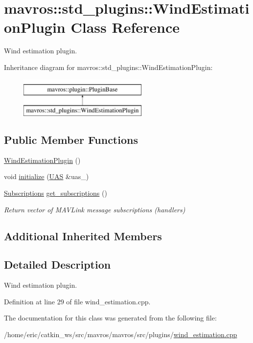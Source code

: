 \hypertarget{classmavros_1_1std__plugins_1_1WindEstimationPlugin}{}\section{mavros\+::std\+\_\+plugins\+::Wind\+Estimation\+Plugin Class Reference}
\label{classmavros_1_1std__plugins_1_1WindEstimationPlugin}


Wind estimation plugin.  


Inheritance diagram for mavros\+::std\+\_\+plugins\+::Wind\+Estimation\+Plugin\+:\begin{figure}[H]
\begin{center}
\leavevmode
\includegraphics[height=2.000000cm]{classmavros_1_1std__plugins_1_1WindEstimationPlugin}
\end{center}
\end{figure}
\subsection*{Public Member Functions}
\begin{DoxyCompactItemize}
\item 
\mbox{\hyperlink{group__plugin_gaf656179c4da289caeea0c7ee36c25de2}{Wind\+Estimation\+Plugin}} ()
\item 
void \mbox{\hyperlink{group__plugin_ga6811f85521065b479c973b2d82353927}{initialize}} (\mbox{\hyperlink{classmavros_1_1UAS}{U\+AS}} \&uas\+\_\+)
\item 
\mbox{\hyperlink{group__plugin_ga8967d61fc77040e0c3ea5a4585d62a09}{Subscriptions}} \mbox{\hyperlink{group__plugin_ga7db9ebfdb92e2537b3b3b844a2483617}{get\+\_\+subscriptions}} ()
\begin{DoxyCompactList}\small\item\em Return vector of M\+A\+V\+Link message subscriptions (handlers) \end{DoxyCompactList}\end{DoxyCompactItemize}
\subsection*{Additional Inherited Members}


\subsection{Detailed Description}
Wind estimation plugin. 

Definition at line 29 of file wind\+\_\+estimation.\+cpp.



The documentation for this class was generated from the following file\+:\begin{DoxyCompactItemize}
\item 
/home/eric/catkin\+\_\+ws/src/mavros/mavros/src/plugins/\mbox{\hyperlink{wind__estimation_8cpp}{wind\+\_\+estimation.\+cpp}}\end{DoxyCompactItemize}

